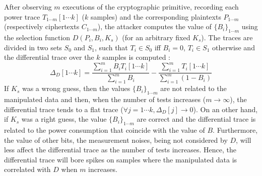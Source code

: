 \documentclass[11pt,a4paper]{article}
\begin{document}
{{{{After observing $m$ executions of the cryptographic primitive, recording each power trace $T_{1\cdots m}[1\cdots k]$ ($k$ samples) and the corresponding plaintexts $P_{1\cdots m}$ 
(respectively ciphertexts $C_{1\cdots m}$), the attacker computes the value of $\{B_i\}_{1\cdots m}$ using the selection function $D(P_i, B_i, K_s)$ (for an arbitrary fixed $K_s$). 
The traces are divided in two sets $S_0$ and $S_1$, such that $T_i \in S_0$ iff $B_i = 0$, $T_i \in S_1$ otherwise and the differential trace over the $k$ samples is computed : 
\begin{displaymath}
 \Delta_D[1\cdots k] = \frac{\sum^{m}_{i=1}B_iT_i[1\cdots k]}{\sum^{m}_{i=1}B_i} - \frac{\sum^{m}_{i=1}T_i[1\cdots k]}{\sum^{m}_{i=1}(1-B_i)}
\end{displaymath}
If $K_s$ was a wrong guess, then the values $\{B_i\}_{1\cdots m}$ are not related to the manipulated data and then, when the number of tests increases ($m \rightarrow \infty$), 
the differential trace tends to a flat trace ($\forall j = 1\cdots k, \Delta_D[j] \rightarrow 0$). On an other hand, if $K_s$ was a right guess, the value $\{B_i\}_{1\cdots m}$ 
are correct and the differential trace is related to the power consumption that coincide with the value of $B$. Furthermore, the value of other bits, the measurement noises, 
being not considered by $D$, will less affect the differential trace as the number of tests increases. Hence, the differential trace will bore spikes on samples where the 
manipulated data is correlated with $D$ when $m$ increases. 
\vspace{1ex} \\
}}}}
\end{document}
